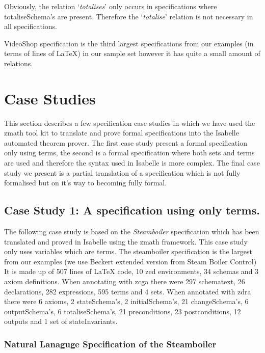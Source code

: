 Obviously, the relation `\emph{totalises}' only occurs in specifications where
totaliseSchema's are present. Therefore the `\emph{totalise}' relation is not
necessary in all specifications.

VideoShop specification is the third largest specifications from our examples (in terms of lines
of \LaTeX{}) in our sample set however it has quite a small amount of relations.

\section{Case Studies}

This section describes a few specification case studies in which we have used
the \gls{zmath} tool kit to translate and prove formal specifications into the
Isabelle automated theorem prover. The first case study present a formal
specification only using terms, the second is a formal specification where both
sets and terms are used and therefore the syntax used in Isabelle is more
complex. The final case study we present is a partial translation of a
specification which is not fully formalised but on it's way to becoming fully
formal.

\subsection{Case Study 1: A specification using only terms.}
\label{subsec:casestudy1}

The following case study is based on the \emph{Steamboiler}
\cite{steamboilerslides} specification which has been translated and proved in
Isabelle using the \gls{zmath} framework. This case study only uses variables
which are terms. The steamboiler specification is the largest from our examples 
(we use Beckert extended version from Steam Boiler Control)
It is made up of 507 lines of \LaTeX{} code, 10 zed environments, 34 schemas and
3 axiom definitions. When annotating with \gls{zcga} there were 297 schematext,
26 declarations, 282 expressions, 595 terms and 4 sets. When annotated with
\gls{zdra} there were 6 axioms, 2 stateSchema's, 2 initialSchema's, 21
changeSchema's, 6 outputSchema's, 6 totaliseSchema's, 21 preconditions, 23
postconditions, 12 outputs and 1 set of stateInvariants.

\subsubsection{Natural Lanaguge Specification of the Steamboiler}

